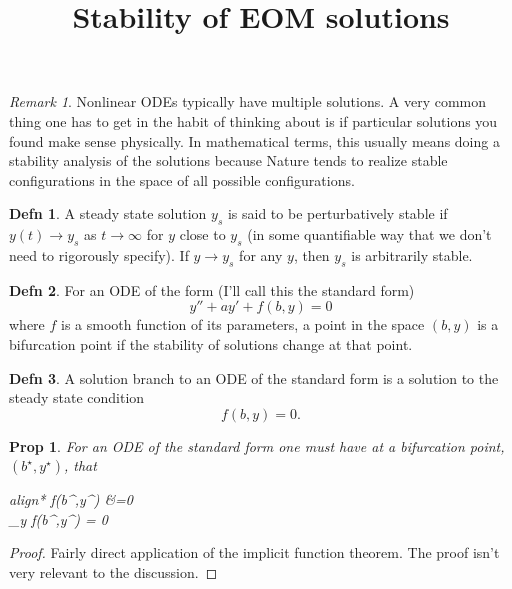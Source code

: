 \documentclass{article}
\title{Stability of EOM solutions}
\newtheorem*{proposition}{Prop}
\theoremstyle{definition}
\newtheorem*{definition}{Defn}
\theoremstyle{remark}
\newtheorem*{remark}{Remark}
\theoremstyle{remark}
\begin{document}
\maketitle

\begin{remark}
	Nonlinear ODEs typically have multiple solutions. A very common thing one has to get in the habit of thinking about is if particular solutions you found make sense physically. In mathematical terms, this usually means doing a stability analysis of the solutions because Nature tends to realize stable configurations in the space of all possible configurations. 
\end{remark}


\begin{definition}
	A steady state solution $y_s$ is said to be perturbatively stable if $y(t)\to y_s$ as $t\to \infty$ for $y$ close to $y_s$ (in some quantifiable way that we don't need to rigorously specify). If $y\to y_s$ for any $y$, then $y_s$ is arbitrarily stable.

\end{definition}
\begin{definition}
	For an ODE of the form (I'll call this the standard form)
	$$
	 y''+ a y'+f(b,y)=0
	$$
	where $f$ is a smooth function of its parameters,
	a point in the space $(b,y)$ is a bifurcation point if the stability of solutions change at that point.
\end{definition}
\begin{definition}
	A solution branch to an ODE of the standard form is a solution to the steady state condition
	$$
	f(b,y)=0.
	$$
\end{definition}

\begin{proposition}
	For an ODE of the standard form one must have at a bifurcation point, $(b^\star,y^\star)$, that
	\begin{empheq}[box=\tcbhighmath]{align*}
   		f(b^\star,y^\star) &=0\\
   		\partial_y f(b^\star,y^\star) = 0
\end{empheq}
\end{proposition}
\begin{proof}
	Fairly direct application of the implicit function theorem. The proof isn't very relevant to the discussion.
\end{proof}
\end{document}
